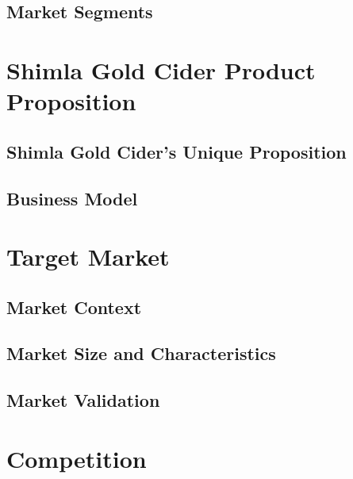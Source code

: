 \documentclass[11pt]{article}
\begin{document}
  \subsection{Market Segments}
\newpage
\section{Shimla Gold Cider Product Proposition}
  \subsection{Shimla Gold Cider's Unique Proposition}
  \subsection{Business Model}
\newpage
\section{Target Market}
  \subsection{Market Context}
  \subsection{Market Size and Characteristics}
  \subsection{Market Validation}
\newpage
\section{Competition}
\end{document}
